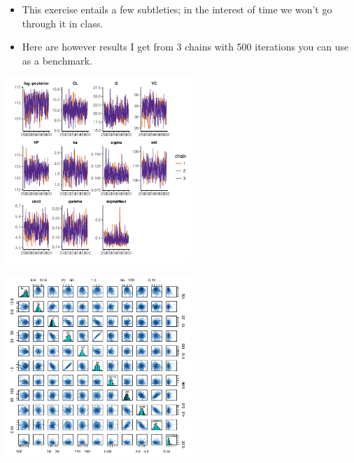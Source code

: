 \documentclass[xcolor=table]{beamer}
\begin{document}
\begin{frame}

  \begin{itemize}
    \item This exercise entails a few subtleties; in the interest of time we won't
    go through it in class.
    \item Here are however results I get from 3 chains with 500 iterations you can
    use as a benchmark.
  \end{itemize}

\end{frame}

\begin{frame}

  \begin{center}
    \includegraphics[width=7cm]{../figures/FKModelPlots002.pdf}
  \end{center}

\end{frame}

\begin{frame}

  \begin{center}
    \includegraphics[width=7cm]{../figures/FKPairs}
  \end{center}

\end{frame}
\end{document}

